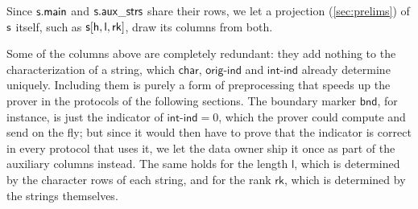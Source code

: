  Since $\mathsf{s}.\mathsf{main}$ and $\mathsf{s}.\mathsf{aux\_strs}$ share their rows, we let a projection (\cref{sec:prelims}) of $\mathsf{s}$ itself, such as $\mathsf{s}[\mathsf{h}, \mathsf{l}, \mathsf{rk}]$, draw its columns from both.

 Some of the columns above are completely redundant: they add nothing to the characterization of a string, which $\mathsf{char}$, $\mathsf{orig\text{-}ind}$ and $\mathsf{int\text{-}ind}$ already determine uniquely. Including them is purely a form of preprocessing that speeds up the prover in the protocols of the following sections. The boundary marker $\mathsf{bnd}$, for instance, is just the indicator of $\mathsf{int\text{-}ind} = 0$, which the prover could compute and send on the fly; but since it would then have to prove that the indicator is correct in every protocol that uses it, we let the data owner ship it once as part of the auxiliary columns instead. The same holds for the length $\mathsf{l}$, which is determined by the character rows of each string, and for the rank $\mathsf{rk}$, which is determined by the strings themselves.
